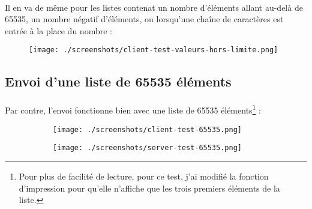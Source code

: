 \documentclass{article}
\begin{document}
    \paragraph{}
    Il en va de même pour les listes contenat un nombre d'éléments allant au-delà de 65535, un nombre négatif d'éléments, ou lorsqu'une chaîne de caractères est entrée à la place du nombre :
    \begin{figure}[H]
        \centering
        \texttt{[image: ./screenshots/client-test-valeurs-hors-limite.png]}
    \end{figure}

    \subsection{Envoi d'une liste de 65535 éléments}
    \paragraph{}
    Par contre, l'envoi fonctionne bien avec une liste de 65535 éléments\footnote{Pour plus de facilité de lecture, pour ce test, j'ai modifié la fonction d'impression pour qu'elle n'affiche que les trois premiers éléments de la liste.} :
    \begin{figure}[H]
        \centering
        \begin{subfigure}[b]{.48\textwidth}
            \centering
            \texttt{[image: ./screenshots/client-test-65535.png]}
        \end{subfigure}
        \begin{subfigure}[b]{.48\textwidth}
            \centering
            \texttt{[image: ./screenshots/server-test-65535.png]}
        \end{subfigure}
    \end{figure}
\end{document}
